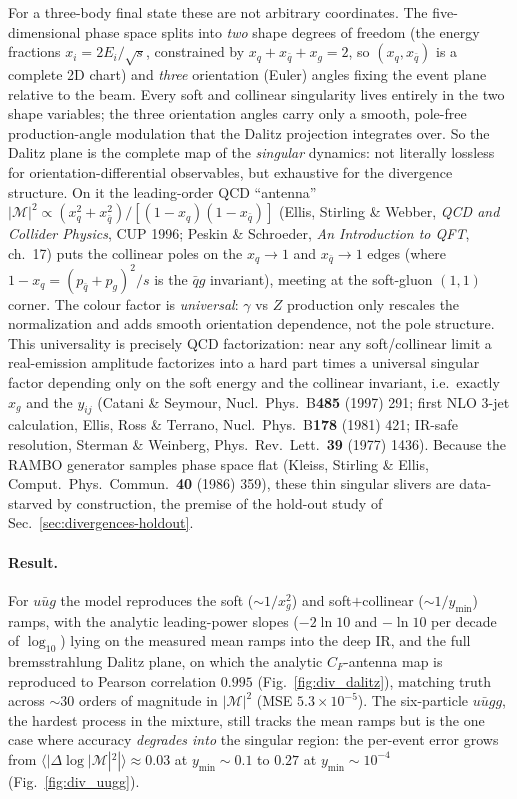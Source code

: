 \documentclass[11pt]{article}
\begin{document}
For a three-body final state these are not arbitrary coordinates. The five-dimensional
phase space splits into \emph{two} shape degrees of freedom (the energy fractions
$x_i=2E_i/\sqrt s$, constrained by $x_q+x_{\bar q}+x_g=2$, so $(x_q,x_{\bar q})$ is a
complete 2D chart) and \emph{three} orientation (Euler) angles fixing the event plane
relative to the beam. Every soft and collinear singularity lives entirely in the two shape
variables; the three orientation angles carry only a smooth, pole-free production-angle
modulation that the Dalitz projection integrates over. So the Dalitz plane is the complete
map of the \emph{singular} dynamics: not literally lossless for orientation-differential
observables, but exhaustive for the divergence structure. On it the leading-order QCD
``antenna'' $|\mathcal{M}|^2\propto(x_q^2+x_{\bar q}^2)/[(1-x_q)(1-x_{\bar q})]$ (Ellis,
Stirling \& Webber, \emph{QCD and Collider Physics}, CUP 1996; Peskin \& Schroeder,
\emph{An Introduction to QFT}, ch.~17) puts the collinear poles on the $x_q\to1$ and
$x_{\bar q}\to1$ edges (where $1-x_q=(p_{\bar q}+p_g)^2/s$ is the $\bar q g$ invariant),
meeting at the soft-gluon $(1,1)$ corner. The colour factor is \emph{universal}:
$\gamma$ vs $Z$ production only rescales the normalization and adds smooth orientation
dependence, not the pole structure. This universality is precisely QCD factorization:
near any soft/collinear limit a real-emission amplitude factorizes into a hard part times a
universal singular factor depending only on the soft energy and the collinear invariant,
i.e.\ exactly $x_g$ and the $y_{ij}$ (Catani \& Seymour, Nucl.\ Phys.\ B\textbf{485} (1997)
291; first NLO 3-jet calculation, Ellis, Ross \& Terrano, Nucl.\ Phys.\ B\textbf{178}
(1981) 421; IR-safe resolution, Sterman \& Weinberg, Phys.\ Rev.\ Lett.\ \textbf{39} (1977)
1436). Because the RAMBO generator samples phase space flat (Kleiss, Stirling \& Ellis,
Comput.\ Phys.\ Commun.\ \textbf{40} (1986) 359), these thin singular slivers are
data-starved by construction, the premise of the hold-out study of
Sec.~\ref{sec:divergences-holdout}.

\paragraph{Result.} For $u\bar u g$ the model reproduces the soft ($\sim1/x_g^2$) and
soft$+$collinear ($\sim1/y_{\min}$) ramps, with the analytic leading-power slopes ($-2\ln10$
and $-\ln10$ per decade of $\log_{10}$) lying on the measured mean ramps into the deep IR,
and the full bremsstrahlung Dalitz plane, on which the analytic $C_F$-antenna map is
reproduced to Pearson correlation $0.995$ (Fig.~\ref{fig:div_dalitz}), matching truth
across $\sim\!30$ orders of magnitude in $|\mathcal{M}|^2$ (MSE $5.3\times10^{-5}$). The six-particle $u\bar u gg$, the hardest process in the
mixture, still tracks the mean ramps but is the one case where accuracy \emph{degrades
into} the singular region: the per-event error grows from
$\langle|\Delta\log|\mathcal{M}|^2|\rangle\approx0.03$ at $y_{\min}\sim0.1$ to $0.27$ at
$y_{\min}\sim10^{-4}$ (Fig.~\ref{fig:div_uugg}).
\end{document}
